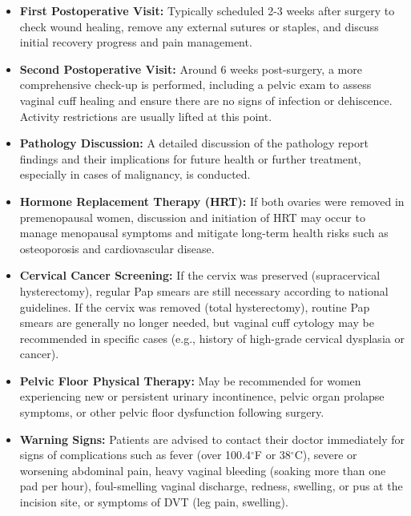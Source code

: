 \begin{itemize}
  \item \textbf{First Postoperative Visit:} Typically scheduled 2-3 weeks after surgery to check wound healing, remove any external sutures or staples, and discuss initial recovery progress and pain management.

  \item \textbf{Second Postoperative Visit:} Around 6 weeks post-surgery, a more comprehensive check-up is performed, including a pelvic exam to assess vaginal cuff healing and ensure there are no signs of infection or dehiscence. Activity restrictions are usually lifted at this point.

  \item \textbf{Pathology Discussion:} A detailed discussion of the pathology report findings and their implications for future health or further treatment, especially in cases of malignancy, is conducted.

  \item \textbf{Hormone Replacement Therapy (HRT):} If both ovaries were removed in premenopausal women, discussion and initiation of HRT may occur to manage menopausal symptoms and mitigate long-term health risks such as osteoporosis and cardiovascular disease.

  \item \textbf{Cervical Cancer Screening:} If the cervix was preserved (supracervical hysterectomy), regular Pap smears are still necessary according to national guidelines. If the cervix was removed (total hysterectomy), routine Pap smears are generally no longer needed, but vaginal cuff cytology may be recommended in specific cases (e.g., history of high-grade cervical dysplasia or cancer).

  \item \textbf{Pelvic Floor Physical Therapy:} May be recommended for women experiencing new or persistent urinary incontinence, pelvic organ prolapse symptoms, or other pelvic floor dysfunction following surgery.

  \item \textbf{Warning Signs:} Patients are advised to contact their doctor immediately for signs of complications such as fever (over 100.4$^{\circ}$F or 38$^{\circ}$C), severe or worsening abdominal pain, heavy vaginal bleeding (soaking more than one pad per hour), foul-smelling vaginal discharge, redness, swelling, or pus at the incision site, or symptoms of DVT (leg pain, swelling).
\end{itemize}


